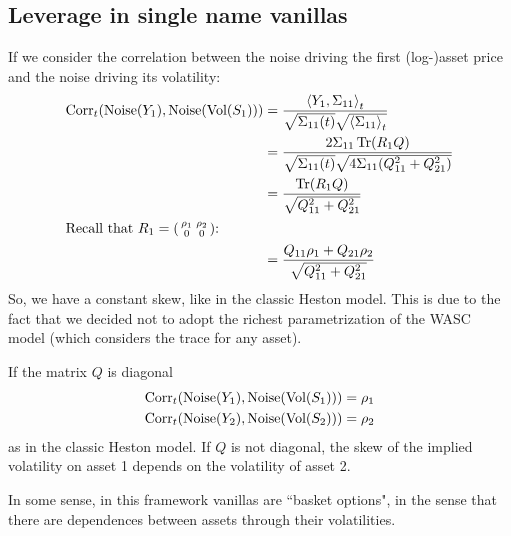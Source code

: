 \subsection{Leverage in single name vanillas}
If we consider the correlation between the noise driving the first (log-)asset price and the noise driving its volatility:
\begin{align}
    \corr_t(\text{Noise}(Y_1),\text{Noise}(\text{Vol}(S_1))) &= \frac{\expval{Y_1,\Sigma_{11}}_t}{\sqrt{\Sigma_{11}(t)}\sqrt{\expval{\Sigma_{11}}_t}} \\
    &=
    \frac{2\Sigma_{11}\Tr(R_1Q)}{\sqrt{\Sigma_{11}(t)}\sqrt{4\Sigma_{11}(Q_{11}^2+Q_{21}^2)}} \\
    &=
    \frac{\Tr(R_1Q)}{\sqrt{Q_{11}^2+Q_{21}^2}} \\
    \intertext{Recall that $R_1 = \smqty(\rho_1 & \rho_2 \\ 0 & 0)$:}
    &=
    \frac{Q_{11}\rho_1+Q_{21}\rho_2}{\sqrt{Q_{11}^2+Q_{21}^2}}
\end{align}
So, we have a constant skew, like in the classic Heston model. This is due to the fact that we decided not to adopt the richest parametrization of the WASC model (which considers the trace for any asset).
\begin{remark}
    If the matrix $Q$ is diagonal
    \begin{align*}
        \operatorname{Corr}_t(\text{Noise}(Y_1),\text{Noise}(\text{Vol}(S_1))) &= \rho_1 \\
        \operatorname{Corr}_t(\text{Noise}(Y_2),\text{Noise}(\text{Vol}(S_2))) &= \rho_2
    \end{align*}
    as in the classic Heston model. If $Q$ is not diagonal, the skew of the implied volatility on asset 1 depends on the volatility of asset 2.
\end{remark}
In some sense, in this framework vanillas are ``basket options", in the sense that there are dependences between assets through their volatilities.

